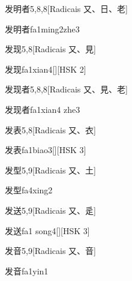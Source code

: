 \begin{entry}{发明者}{5,8,8}[Radicais ⼜、⽇、⽼]
  \begin{phonetics}{发明者}{fa1ming2zhe3}
  \end{phonetics}
\end{entry}

\begin{entry}{发现}{5,8}[Radicais ⼜、⾒]
  \begin{phonetics}{发现}{fa1xian4}[][HSK 2]
  \end{phonetics}
\end{entry}

\begin{entry}{发现者}{5,8,8}[Radicais ⼜、⾒、⽼]
  \begin{phonetics}{发现者}{fa1xian4 zhe3}
  \end{phonetics}
\end{entry}

\begin{entry}{发表}{5,8}[Radicais ⼜、⾐]
  \begin{phonetics}{发表}{fa1biao3}[][HSK 3]
  \end{phonetics}
\end{entry}

\begin{entry}{发型}{5,9}[Radicais ⼜、⼟]
  \begin{phonetics}{发型}{fa4xing2}
  \end{phonetics}
\end{entry}

\begin{entry}{发送}{5,9}[Radicais ⼜、⾡]
  \begin{phonetics}{发送}{fa1 song4}[][HSK 3]
  \end{phonetics}
\end{entry}

\begin{entry}{发音}{5,9}[Radicais ⼜、⾳]
  \begin{phonetics}{发音}{fa1yin1}
  \end{phonetics}
\end{entry}

